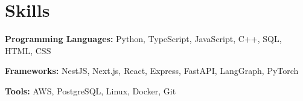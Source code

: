\section{Skills}

    \begin{onecolentry}
        \textbf{Programming Languages:} Python, TypeScript, JavaScript, C++, SQL, HTML, CSS
    \end{onecolentry}

    \vspace{0.05 cm}

    \begin{onecolentry}
        \textbf{Frameworks:} NestJS, Next.js, React, Express, FastAPI, LangGraph, PyTorch
    \end{onecolentry}

    \vspace{0.05 cm}

    \begin{onecolentry}
        \textbf{Tools:} AWS, PostgreSQL, Linux, Docker, Git
    \end{onecolentry}

    \vspace{0.05 cm}

